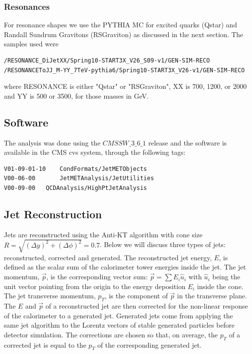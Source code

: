 \subsubsection{Resonances}
For resonance shapes we use the PYTHIA MC for excited quarks (Qstar) and Randall Sundrum 
Gravitons (RSGraviton) as discussed in the next section.  The samples used were
\begin{verbatim}
/RESONANCE_DiJetXX/Spring10-START3X_V26_S09-v1/GEN-SIM-RECO
/RESONANCEToJJ_M-YY_7TeV-pythia6/Spring10-START3X_V26-v1/GEN-SIM-RECO
\end{verbatim}
where RESONANCE is either "Qstar" or "RSGraviton",  XX is 700, 1200, or 2000 and YY is 500 or 3500, for those
masses in GeV.


\subsection{Software}
The analysis was done using the 
$CMSSW\_3\_6\_1$ release and the software is available in the CMS cvs system, through the following
tags:
\begin{verbatim}
V01-09-01-10    CondFormats/JetMETObjects
V00-06-00       JetMETAnalysis/JetUtilities                      
V00-09-00	QCDAnalysis/HighPtJetAnalysis
\end{verbatim}


\subsection{Jet Reconstruction}


Jets are reconstructed using the Anti-KT algorithm with cone size 
$R=\sqrt{(\Delta y)^2 + (\Delta\phi)^2}=0.7$. 
Below we will discuss three types of jets: reconstructed, corrected and generated.
The reconstructed jet energy, $E$, is defined as the scalar sum of the calorimeter tower
energies inside the jet. The jet momentum, $\vec{p}$, is the corresponding vector sum:
$\vec{p} = \sum{E_i\hat{u}_i}$ with $\hat{u}_i$ being the
unit vector pointing from the origin to the energy
deposition $E_i$ inside the cone. The jet transverse momentum, $p_T$, is the component
of $\vec{p}$ in the transverse plane.
The $E$ and $\vec{p}$ of a reconstructed jet are then corrected for the
non-linear response of the calorimeter to a generated jet.
Generated jets come
from applying the same jet algorithm to the Lorentz vectors of stable generated particles
before detector simulation.
The corrections are chosen so that, on average, the $p_T$ of a
corrected jet is equal to the $p_T$ of the corresponding generated jet. 

